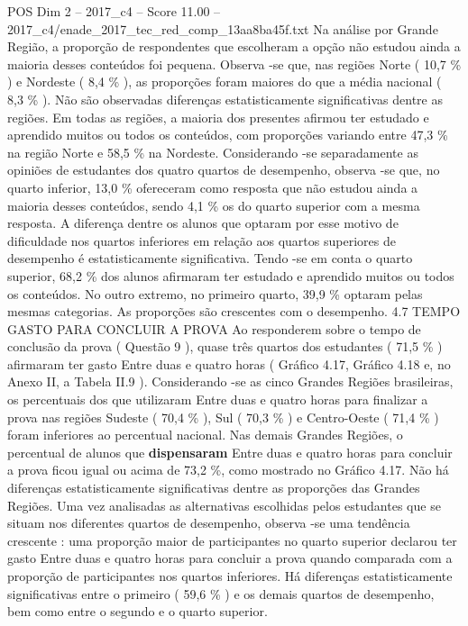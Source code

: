 \begin{textsample}{POS Dim 2 – 2017\_c4 – Score 11.00 – 2017\_c4/enade\_2017\_tec\_red\_comp\_13aa8ba45f.txt}
Na análise por Grande Região, a proporção de respondentes que escolheram a opção não estudou ainda a maioria desses conteúdos foi pequena.
Observa -se que, nas regiões Norte ( 10,7 \% ) e Nordeste ( 8,4 \% ), as proporções foram maiores do que a média nacional ( 8,3 \% ).
Não são observadas diferenças estatisticamente significativas dentre as regiões.
Em todas as regiões, a maioria dos presentes afirmou ter estudado e aprendido muitos ou todos os conteúdos, com proporções variando entre 47,3 \% na região Norte e 58,5 \% na Nordeste.
Considerando -se separadamente as opiniões de estudantes dos quatro quartos de desempenho, observa -se que, no quarto inferior, 13,0 \% ofereceram como resposta que não estudou ainda a maioria desses conteúdos, sendo 4,1 \% os do quarto superior com a mesma resposta.
A diferença dentre os alunos que optaram por esse motivo de dificuldade nos quartos inferiores em relação aos quartos superiores de desempenho é estatisticamente significativa.
Tendo -se em conta o quarto superior, 68,2 \% dos alunos afirmaram ter estudado e aprendido muitos ou todos os conteúdos.
No outro extremo, no primeiro quarto, 39,9 \% optaram pelas mesmas categorias.
As proporções são crescentes com o desempenho. 4.7 TEMPO GASTO PARA CONCLUIR A PROVA Ao responderem sobre o tempo de conclusão da prova ( Questão 9 ), quase três quartos dos estudantes ( 71,5 \% ) afirmaram ter gasto Entre duas e quatro horas ( Gráfico 4.17, Gráfico 4.18 e, no Anexo II, a Tabela II.9 ).
Considerando -se as cinco Grandes Regiões brasileiras, os percentuais dos que utilizaram Entre duas e quatro horas para finalizar a prova nas regiões Sudeste ( 70,4 \% ), Sul ( 70,3 \% ) e Centro-Oeste ( 71,4 \% ) foram inferiores ao percentual nacional.
Nas demais Grandes Regiões, o percentual de alunos que \textbf{dispensaram} Entre duas e quatro horas para concluir a prova ficou igual ou acima de 73,2 \%, como mostrado no Gráfico 4.17.
Não há diferenças estatisticamente significativas dentre as proporções das Grandes Regiões.
Uma vez analisadas as alternativas escolhidas pelos estudantes que se situam nos diferentes quartos de desempenho, observa -se uma tendência crescente : uma proporção maior de participantes no quarto superior declarou ter gasto Entre duas e quatro horas para concluir a prova quando comparada com a proporção de participantes nos quartos inferiores.
Há diferenças estatisticamente significativas entre o primeiro ( 59,6 \% ) e os demais quartos de desempenho, bem como entre o segundo e o quarto superior.

\end{textsample}
